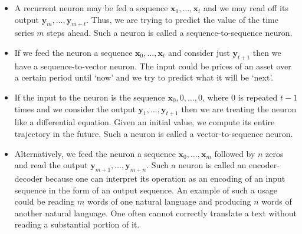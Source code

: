 \documentclass[11pt]{article}
\numberwithin{equation}{section}
\renewcommand{\vec}{\mathbf}
\begin{document}
\begin{itemize}
\item A recurrent neuron may be fed a sequence $\vec{x}_0, \ldots, \vec{x}_t$
and we may read off its output $\vec{y}_m, \ldots, \vec{y}_{m+t}$. Thus, 
we are trying to predict the value of the time series $m$ steps ahead. Such
a neuron is called a sequence-to-sequence neuron.
\item If we feed the neuron a sequence $\vec{x}_0, \ldots, \vec{x}_t$ and
consider just $\vec{y}_{t+1}$ then we have a sequence-to-vector neuron. The 
input could be prices of an asset over a certain period until `now' and we
try to predict what it will be `next'.
\item If the input to the neuron is the sequence $\vec{x}_0, 0, \ldots, 0$,
where $0$ is repeated $t - 1$ times and we consider the output $\vec{y}_1,
\ldots, \vec{y}_{t+1}$ then we are treating the neuron like a differential
equation. Given an initial value, we compute its entire trajectory in the
future. Such a neuron is called a vector-to-sequence neuron.
\item Alternatively, we feed the neuron a sequence $\vec{x}_0, \ldots, 
\vec{x}_m$ followed by $n$ zeros and read the output $\vec{y}_{m+1}, \ldots,
\vec{y}_{m+n}$. Such a neuron is called an encoder-decoder because one can
interpret its operation as an encoding of an input sequence in the form of
an output sequence. An example of such a usage could be reading $m$ words of
one natural language and producing $n$ words of another natural language. One
often cannot correctly translate a text without reading a substantial portion
of it.
\end{itemize}
\end{document}
